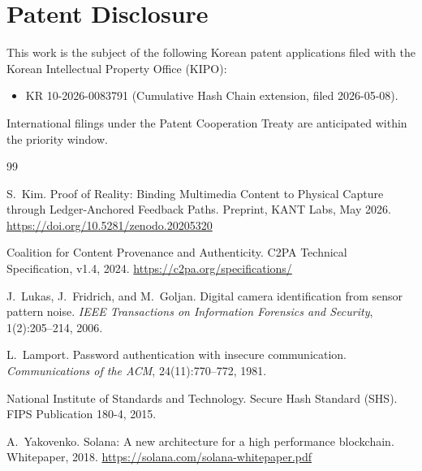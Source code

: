 \documentclass[11pt]{article}
\begin{document}
\section*{Patent Disclosure}

This work is the subject of the following Korean patent applications filed with the
Korean Intellectual Property Office (KIPO):

\begin{itemize}
  \item KR 10-2026-0083791 (Cumulative Hash Chain extension, filed 2026-05-08).
\end{itemize}

International filings under the Patent Cooperation Treaty are anticipated within the
priority window.


\begin{thebibliography}{99}

S.~Kim.
\newblock Proof of Reality: Binding Multimedia Content to Physical Capture
  through Ledger-Anchored Feedback Paths.
\newblock Preprint, KANT Labs, May 2026.
\newblock \url{https://doi.org/10.5281/zenodo.20205320}

Coalition for Content Provenance and Authenticity.
\newblock C2PA Technical Specification, v1.4, 2024.
\newblock \url{https://c2pa.org/specifications/}

J.~Lukas, J.~Fridrich, and M.~Goljan.
\newblock Digital camera identification from sensor pattern noise.
\newblock \emph{IEEE Transactions on Information Forensics and Security},
  1(2):205--214, 2006.

L.~Lamport.
\newblock Password authentication with insecure communication.
\newblock \emph{Communications of the ACM}, 24(11):770--772, 1981.

National Institute of Standards and Technology.
\newblock Secure Hash Standard (SHS).
\newblock FIPS Publication 180-4, 2015.

A.~Yakovenko.
\newblock Solana: A new architecture for a high performance blockchain.
\newblock Whitepaper, 2018.
\newblock \url{https://solana.com/solana-whitepaper.pdf}

\end{thebibliography}
\end{document}
